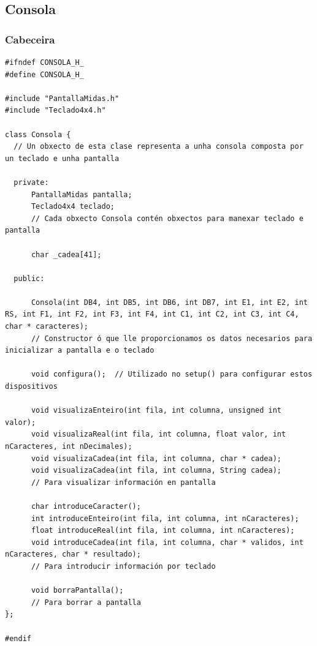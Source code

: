\documentclass[11pt,twoside]{book}
\begin{document}
\subsection{Consola}
\subsubsection{Cabeceira}
\begin{lstlisting}
#ifndef CONSOLA_H_
#define CONSOLA_H_

#include "PantallaMidas.h"
#include "Teclado4x4.h"

class Consola {
  // Un obxecto de esta clase representa a unha consola composta por un teclado e unha pantalla
  
  private:
      PantallaMidas pantalla;
      Teclado4x4 teclado;
      // Cada obxecto Consola contén obxectos para manexar teclado e pantalla
      
      char _cadea[41];
      
  public: 
  
      Consola(int DB4, int DB5, int DB6, int DB7, int E1, int E2, int RS, int F1, int F2, int F3, int F4, int C1, int C2, int C3, int C4, char * caracteres);
      // Constructor ó que lle proporcionamos os datos necesarios para inicializar a pantalla e o teclado
      
      void configura();  // Utilizado no setup() para configurar estos dispositivos
      
      void visualizaEnteiro(int fila, int columna, unsigned int valor);
      void visualizaReal(int fila, int columna, float valor, int nCaracteres, int nDecimales);
      void visualizaCadea(int fila, int columna, char * cadea);  
      void visualizaCadea(int fila, int columna, String cadea);
      // Para visualizar información en pantalla
      
      char introduceCaracter();
      int introduceEnteiro(int fila, int columna, int nCaracteres);
      float introduceReal(int fila, int columna, int nCaracteres);
      void introduceCadea(int fila, int columna, char * validos, int nCaracteres, char * resultado);
      // Para introducir información por teclado
      
      void borraPantalla();
      // Para borrar a pantalla
};

#endif
\end{lstlisting}
\end{document}
